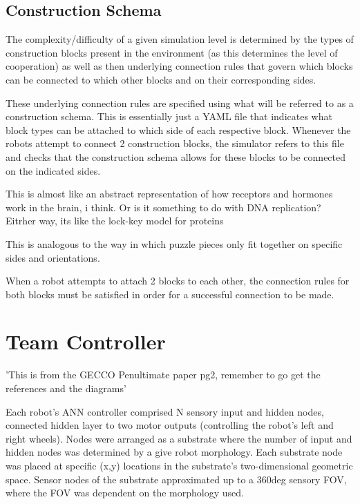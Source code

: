 \subsection{Construction Schema}

The complexity/difficulty of a given simulation level is determined by the types of construction blocks present in the environment (as this determines the level of cooperation) as well as then underlying connection rules that govern which blocks can be connected to which other blocks and on their corresponding sides.

These underlying connection rules are specified using what will be referred to as a construction schema. This is essentially just a YAML file that indicates what block types can be attached to which side of each respective block. Whenever the robots attempt to connect 2 construction blocks, the simulator refers to this file and checks that the construction schema allows for these blocks to be connected on the indicated sides.

This is almost like an abstract representation of how receptors and hormones work in the brain, i think. Or is it something to do with DNA replication? Eitrher way, its like the lock-key model for proteins

This is analogous to the way in which puzzle pieces only fit together on specific sides and orientations.

When a robot attempts to attach 2 blocks to each other, the connection rules for both blocks must be satisfied in order for a successful connection to be made.


\section{Team Controller}

'This is from the GECCO Penultimate paper pg2, remember to go get the references and the diagrams'

Each robot's ANN controller comprised N sensory input and hidden nodes, connected hidden layer to two motor outputs (controlling the robot's left and right wheels). Nodes were arranged as a substrate where the number of input and hidden nodes was determined by a give robot morphology. Each substrate node was placed at specific (x,y) locations in the substrate's two-dimensional geometric space. Sensor nodes of the substrate approximated up to a 360deg sensory FOV, where the FOV was dependent on the morphology used.































